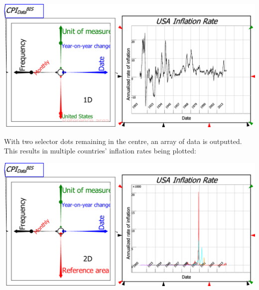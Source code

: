 \includegraphics[width=15cm]{images/RavelDataSeriesSelected}

With two selector dots remaining in the centre, an array of data is
outputted. This results in multiple countries' inflation rates being
plotted:

\includegraphics[width=15cm]{images/RavelData2SeriesSelected}

